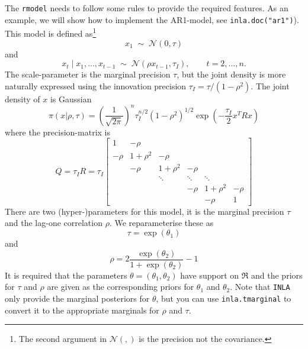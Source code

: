 \documentclass[a4paper,11pt]{article}
\begin{document}
The \texttt{rmodel} needs to follow some rules to provide the required
features. As an example, we will show how to implement the AR1-model,
see \texttt{inla.doc("ar1")}). This model is defined as\footnote{The
    second argument in ${\mathcal N}(,)$ is the precision not the
    covariance.}
\begin{displaymath}
    x_{1} \;\sim\; {\mathcal N}(0, \tau)
\end{displaymath}
and
\begin{displaymath}
    x_{t} \mid x_{1}, \ldots, x_{t-1} \;\sim\; {\mathcal N}(\rho
    x_{t-1}, \tau_{I}), \qquad t=2, \ldots,n.
\end{displaymath}
The scale-parameter is the marginal precision $\tau$, but the joint
density is more naturally expressed using the innovation precision
$\tau_{I} = \tau/(1-\rho^{2})$. The joint density of $x$ is Gaussian
\begin{displaymath}
    \pi(x|\rho,\tau) = \left(\frac{1}{\sqrt{2\pi}}\right)^{n}
    \tau_{I}^{n/2} (1-\rho^{2})^{1/2}
    \exp\left(-\frac{\tau_{I}}{2} x^{T} R x\right)
\end{displaymath}
where the precision-matrix is
\begin{displaymath}
    Q = \tau_I R = 
    \tau_I
    \begin{bmatrix}
        1 & -\rho &&&& \\
        -\rho & 1+\rho^{2}& -\rho &&& \\
        &-\rho & 1+\rho^{2}& -\rho && \\
        && \ddots& \ddots& \ddots& \\
        &       &       &       -\rho & 1 + \rho^{2} & -\rho\\
        & & & & -\rho & 1
    \end{bmatrix}
\end{displaymath}
There are two (hyper-)parameters for this model, it is the marginal
precision $\tau$ and the lag-one correlation $\rho$.  We
reparameterise these as
\begin{displaymath}
    \tau = \exp(\theta_1) 
\end{displaymath}
and
\begin{displaymath}
    \rho = 2\frac{\exp(\theta_{2})}{1+\exp(\theta_{2})} - 1
\end{displaymath}
It is required that the parameters $\theta = (\theta_{1}, \theta_{2})$
have support on $\Re$ and the priors for $\tau$ and $\rho$ are given
as the corresponding priors for $\theta_{1}$ and $\theta_{2}$. Note
that \texttt{INLA} only provide the marginal posteriors for $\theta$,
but you can use \texttt{inla.tmarginal} to convert it to the
appropriate marginals for $\rho$ and $\tau$.
\end{document}
